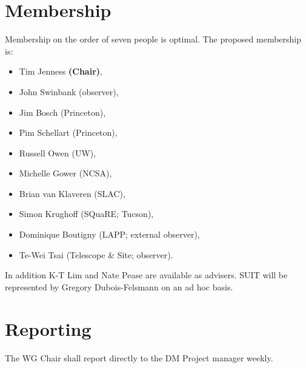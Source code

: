 \section{Membership}

Membership on the order of seven people is optimal.
The proposed membership is:

\begin{itemize}
  \item Tim Jenness \textbf{(Chair)},
  \item John Swinbank (observer),
  \item Jim Bosch (Princeton),
  \item Pim Schellart (Princeton),
  \item Russell Owen (UW),
  \item Michelle Gower (NCSA),
  \item Brian van Klaveren (SLAC),
  \item Simon Krughoff (SQuaRE; Tucson),
  \item Dominique Boutigny (LAPP; external observer),
  \item Te-Wei Tsai (Telescope \& Site; observer).
\end{itemize}

In addition K-T Lim and Nate Pease are available as advisers.
SUIT will be represented by Gregory Dubois-Felsmann on an ad hoc basis.

\section{Reporting}

The WG Chair shall report directly to the DM Project manager weekly.
